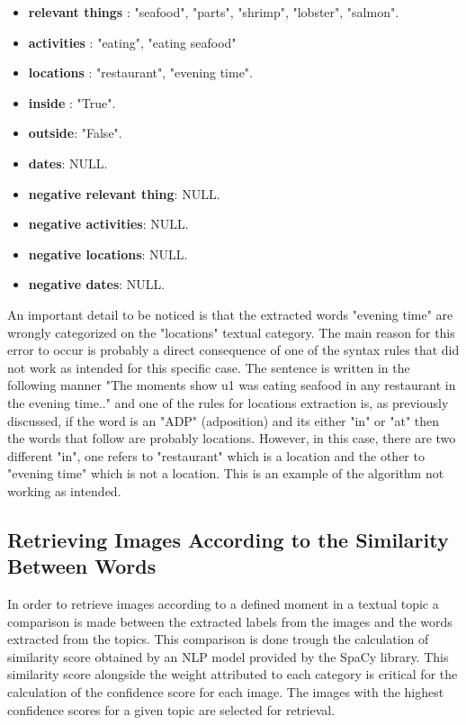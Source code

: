       \begin{itemize}
        \itemsep0em
        \item \textbf{relevant things} : 
            "seafood",
            "parts",
            "shrimp",
            "lobster",
            "salmon".
        \item \textbf{activities} : "eating",
        "eating seafood"
        \item \textbf{locations} : "restaurant",  "evening time".
        \item \textbf{inside} : "True".
        \item \textbf{outside}: "False".
        \item \textbf{dates}: NULL.
        \item \textbf{negative relevant thing}: NULL.
        \item \textbf{negative activities}: NULL.
        \item \textbf{negative locations}:  NULL.
        \item \textbf{negative dates}: NULL.
       
    \end{itemize}
\newpage
    An important detail to be noticed is that the extracted words "evening time" are wrongly categorized on the "locations" textual category. The main reason for this error to occur is probably a direct consequence of one of the syntax rules that did not work as intended for this specific case. The sentence is written in the following manner "The moments show u1 was eating seafood in any restaurant in the evening time.." and one of the rules for locations extraction is, as previously discussed, if the word is an "ADP" (adposition) and its either "in" or "at" then the words that follow are probably locations. However, in this case, there are two different "in", one refers to "restaurant" which is a location and the other to "evening time" which is not a location. This is an example of the algorithm not working as intended.

    \subsection{Retrieving Images According to the Similarity Between Words}

    In order to retrieve images according to a defined moment in a textual topic a comparison is made between the extracted labels from the images and the words extracted from the topics. This comparison is done trough the calculation of similarity score obtained by an NLP model provided by the SpaCy library. This similarity score alongside the weight attributed to each category is critical for the calculation of the confidence score for each image. The images with the highest confidence scores for a given topic are selected for retrieval.
    

